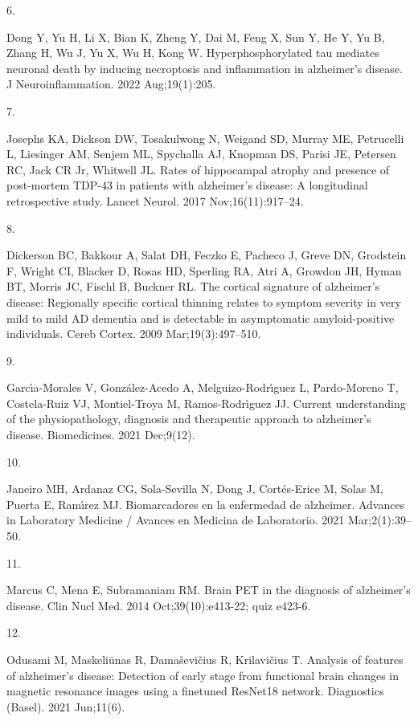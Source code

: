 \documentclass[
  a4paper,
]{article}
\newlength{\cslhangindent}
\newlength{\csllabelwidth}
\newlength{\cslentryspacingunit} %
\newenvironment{CSLReferences}[2] %
 {%
  \setlength{\parindent}{0pt}
  \ifodd #1
  \let\oldpar\par
  \def\par{\hangindent=\cslhangindent\oldpar}
  \fi
  \setlength{\parskip}{#2\cslentryspacingunit}
 }%
 {}
\newcommand{\CSLLeftMargin}[1]{\parbox[t]{\csllabelwidth}{#1}}
\newcommand{\CSLRightInline}[1]{\parbox[t]{\linewidth - \csllabelwidth}{#1}\break}
\begin{document}
\begin{CSLReferences}{0}{0}
\leavevmode{}%
\CSLLeftMargin{6. }%
\CSLRightInline{Dong Y, Yu H, Li X, Bian K, Zheng Y, Dai M, Feng X, Sun
Y, He Y, Yu B, Zhang H, Wu J, Yu X, Wu H, Kong W. Hyperphosphorylated
tau mediates neuronal death by inducing necroptosis and inflammation in
alzheimer's disease. J Neuroinflammation. 2022 Aug;19(1):205. }

\leavevmode{}%
\CSLLeftMargin{7. }%
\CSLRightInline{Josephs KA, Dickson DW, Tosakulwong N, Weigand SD,
Murray ME, Petrucelli L, Liesinger AM, Senjem ML, Spychalla AJ, Knopman
DS, Parisi JE, Petersen RC, Jack CR Jr, Whitwell JL. Rates of
hippocampal atrophy and presence of post-mortem {TDP-43} in patients
with alzheimer's disease: A longitudinal retrospective study. Lancet
Neurol. 2017 Nov;16(11):917--24. }

\leavevmode{}%
\CSLLeftMargin{8. }%
\CSLRightInline{Dickerson BC, Bakkour A, Salat DH, Feczko E, Pacheco J,
Greve DN, Grodstein F, Wright CI, Blacker D, Rosas HD, Sperling RA, Atri
A, Growdon JH, Hyman BT, Morris JC, Fischl B, Buckner RL. The cortical
signature of alzheimer's disease: Regionally specific cortical thinning
relates to symptom severity in very mild to mild {AD} dementia and is
detectable in asymptomatic amyloid-positive individuals. Cereb Cortex.
2009 Mar;19(3):497--510. }

\leavevmode{}%
\CSLLeftMargin{9. }%
\CSLRightInline{Garcı́a-Morales V, González-Acedo A, Melguizo-Rodrı́guez
L, Pardo-Moreno T, Costela-Ruiz VJ, Montiel-Troya M, Ramos-Rodrı́guez JJ.
Current understanding of the physiopathology, diagnosis and therapeutic
approach to alzheimer's disease. Biomedicines. 2021 Dec;9(12). }

\leavevmode{}%
\CSLLeftMargin{10. }%
\CSLRightInline{Janeiro MH, Ardanaz CG, Sola-Sevilla N, Dong J,
Cortés-Erice M, Solas M, Puerta E, Ramı́rez MJ. Biomarcadores en la
enfermedad de alzheimer. Advances in Laboratory Medicine / Avances en
Medicina de Laboratorio. 2021 Mar;2(1):39--50. }

\leavevmode{}%
\CSLLeftMargin{11. }%
\CSLRightInline{Marcus C, Mena E, Subramaniam RM. Brain {PET} in the
diagnosis of alzheimer's disease. Clin Nucl Med. 2014
Oct;39(10):e413-22; quiz e423-6. }

\leavevmode{}%
\CSLLeftMargin{12. }%
\CSLRightInline{Odusami M, Maskeliūnas R, Damaševičius R, Krilavičius T.
Analysis of features of alzheimer's disease: Detection of early stage
from functional brain changes in magnetic resonance images using a
finetuned {ResNet18} network. Diagnostics (Basel). 2021 Jun;11(6). }


\end{CSLReferences}
\end{document}
